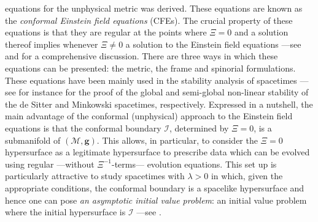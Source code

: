 \documentclass[10pt,a4paper]{article}
\theoremstyle{plain}
\def\bmg{{\bm g}}
\begin{document}
equations for the unphysical metric was derived. These equations are
known as the \emph{conformal Einstein field equations} (CFEs).  The crucial
property of these equations is that they are regular at the points
where $\Xi=0$ and a solution thereof implies whenever $\Xi\neq 0$ a
solution to the Einstein field equations ---see \cite{Fri81a,Fri83}
and \cite{CFEbook} for a comprehensive discussion.  There are three
ways in which these equations can be presented: the metric, the frame
and spinorial formulations. These equations have been mainly used in
the stability analysis of spacetimes ---see for instance \cite{Fri86b,
  Fri86c} for the proof of the global and semi-global non-linear
stability of the de Sitter and Minkowski spacetimes, respectively.
Expressed in a nutshell, the main advantage of the conformal
(unphysical) approach to the Einstein field equations is that the
conformal boundary $\mathscr{I}$, determined by $\Xi=0$, is a
submanifold of $(\mathcal{M},\bmg)$. This allows, in particular, to
consider the $\Xi=0$ hypersurface as a legitimate hypersurface to
prescribe data which can be evolved using regular ---without
$\Xi^{-1}$-terms--- evolution equations. 
This set up is particularly attractive to study
spacetimes with $\lambda>0$ in which, given the appropriate
conditions, the conformal boundary is a spacelike
hypersurface and hence one can pose \emph{an asymptotic initial value
problem}: an initial value problem where the initial hypersurface is
$\mathscr{I}$ ---see \cite{GasVal17,MarPaeSenSim16, LueVal09}.

\medskip
\end{document}
